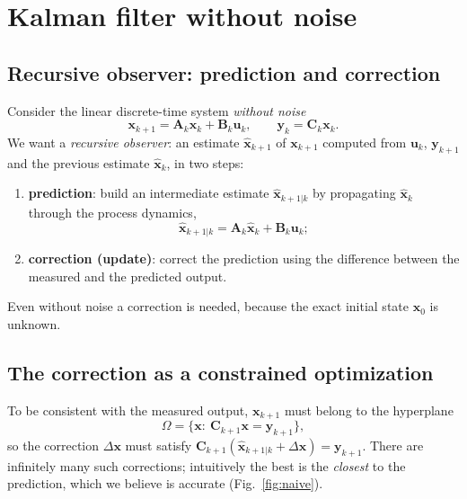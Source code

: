\documentclass[11pt,a4paper]{article}
\newcommand{\hx}{\hat{\boldsymbol{x}}}
\newcommand{\bx}{\boldsymbol{x}}
\newcommand{\bu}{\boldsymbol{u}}
\newcommand{\by}{\boldsymbol{y}}
\newcommand{\mA}{\mathbf{A}}
\newcommand{\mB}{\mathbf{B}}
\newcommand{\mC}{\mathbf{C}}
\newcommand{\slides}[1]{\texorpdfstring{\hspace{0.5em}{\normalfont\small\emph{(#1)}}}{}}
\theoremstyle{plain}
\theoremstyle{definition}
\theoremstyle{remark}
\begin{document}
\section{Kalman filter without noise \slides{EKF deck, slides 5--9}}

\subsection{Recursive observer: prediction and correction}

Consider the linear discrete-time system \emph{without noise}
\begin{equation}\label{eq:lin-nonoise}
\bx_{k+1}=\mA_k\bx_k+\mB_k\bu_k,\qquad \by_k=\mC_k\bx_k .
\end{equation}
We want a \emph{recursive observer}: an estimate $\hx_{k+1}$ of $\bx_{k+1}$ computed from $\bu_k$, $\by_{k+1}$ and the previous
estimate $\hx_k$, in two steps:
\begin{enumerate}
\item \textbf{prediction}: build an intermediate estimate $\hx_{k+1|k}$ by propagating $\hx_k$ through the process dynamics,
\begin{equation}\label{eq:pred0}
\hx_{k+1|k}=\mA_k\hx_k+\mB_k\bu_k ;
\end{equation}
\item \textbf{correction (update)}: correct the prediction using the difference between the measured and the predicted output.
\end{enumerate}
Even without noise a correction is needed, because the exact initial state $\bx_0$ is unknown.

\subsection{The correction as a constrained optimization}

To be consistent with the measured output, $\bx_{k+1}$ must belong to the hyperplane
\begin{equation}\label{eq:Omega}
\Omega=\{\bx:\ \mC_{k+1}\bx=\by_{k+1}\},
\end{equation}
so the correction $\Delta\bx$ must satisfy $\mC_{k+1}(\hx_{k+1|k}+\Delta\bx)=\by_{k+1}$. There are infinitely many such
corrections; intuitively the best is the \emph{closest} to the prediction, which we believe is accurate (Fig.~\ref{fig:naive}).
\end{document}
